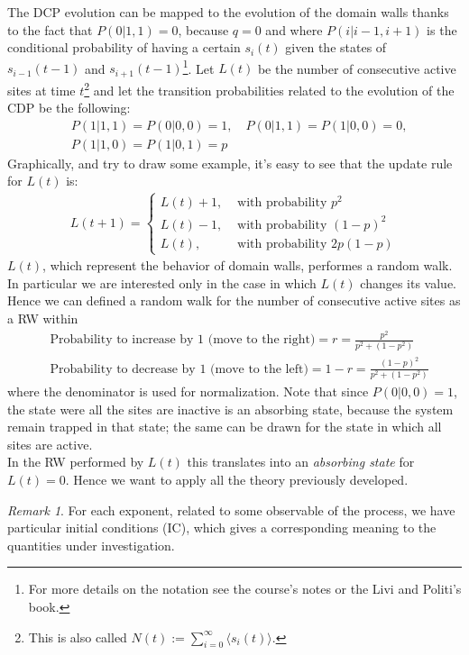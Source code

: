 \documentclass[4apaper,11pt,fleqn]{article}
\theoremstyle{remark}
\newtheorem*{rem}{Remark}
\theoremstyle{definition}
\begin{document}
The DCP evolution can be mapped to the evolution of the domain walls thanks to the fact that $P(0|1,1)=0$, because $q=0$ and where $P(i|i-1,i+1)$ is the conditional probability of having a certain $s_i(t)$ given the states of $s_{i-1}(t-1)$ and $s_{i+1}(t-1)$\;\footnote{For more details on the notation see the course's notes or the Livi and Politi's book.}. Let $L(t)$ be the number of consecutive active sites at time $t$\;\footnote{This is also called $N(t) := \sum_{i=0}^{\infty} \langle s_i(t) \rangle$.} and let the transition probabilities related to the evolution of the CDP be the following:
\begin{align*}
  &P(1|1,1) = P(0|0,0) = 1, \quad P(0|1,1) = P(1|0,0) = 0, \\
  &P(1|1,0) = P(1|0,1) = p
\end{align*}
Graphically, and try to draw some example, it's easy to see that the update rule for $L(t)$ is:
\begin{align}
  L(t+1)=\left\{\begin{array}{cl}{L(t)+1,} & {\text { with probability } p^{2}} \\ {L(t)-1,} & {\text { with probability }(1-p)^{2}} \\ {L(t),} & {\text { with probability } 2 p(1-p)}\end{array}\right.
\end{align}
$L(t)$, which represent the behavior of domain walls, performes a random walk. In particular we are interested only in the case in which $L(t)$ changes its value. Hence we can defined a random walk for the number of consecutive active sites as a RW within
\begin{align*}
  &\text{Probability to increase by 1 (move to the right)} = r = \frac{p^2}{p^2+(1-p^2)} \\
  &\text{Probability to decrease by 1 (move to the left)}  = 1-r = \frac{(1-p)^2}{p^2+(1-p^2)}
\end{align*}
where the denominator is used for normalization. Note that since $P(0|0,0) = 1$, the state were all the sites are inactive is an absorbing state, because the system remain trapped in that state; the same can be drawn for the state in which all sites are active.\\
In the RW performed by $L(t)$ this translates into an \emph{absorbing state} for $L(t)=0$. Hence we want to apply all the theory previously developed.
\begin{rem}
  For each exponent, related to some observable of the process, we have particular initial conditions (IC), which gives a corresponding meaning to the quantities under investigation.
\end{rem}
\end{document}
